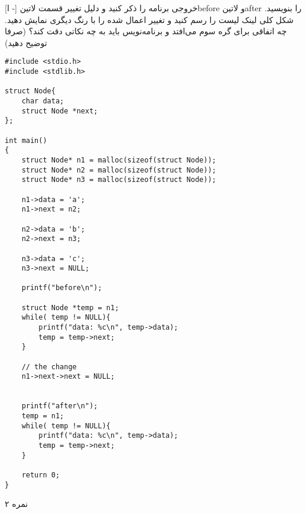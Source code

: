 
[ا -]
     خروجی برنامه را ذکر کنید و دلیل تغییر قسمت ‌لاتین{before} و ‌لاتین{after} را بنویسید.
     شکل کلی لینک لیست را رسم کنید و تغییر اعمال شده را با رنگ دیگری نمایش دهید.
     چه اتفاقی برای گره سوم می‌افتد و برنامه‌نویس باید به چه نکاتی دقت کند؟ (صرفا توضیح دهید)

\begin{latin}
\begin{verbatim}
#include <stdio.h>
#include <stdlib.h>

struct Node{
    char data;
    struct Node *next;
};

int main()
{
    struct Node* n1 = malloc(sizeof(struct Node));
    struct Node* n2 = malloc(sizeof(struct Node));
    struct Node* n3 = malloc(sizeof(struct Node));

    n1->data = 'a';
    n1->next = n2;

    n2->data = 'b';
    n2->next = n3;

    n3->data = 'c';
    n3->next = NULL;

    printf("before\n");

    struct Node *temp = n1;
    while( temp != NULL){
        printf("data: %c\n", temp->data);
        temp = temp->next;
    }

    // the change
    n1->next->next = NULL;


    printf("after\n");
    temp = n1;
    while( temp != NULL){
        printf("data: %c\n", temp->data);
        temp = temp->next;
    }

    return 0;
}
\end{verbatim}
\end{latin}

۲ نمره
